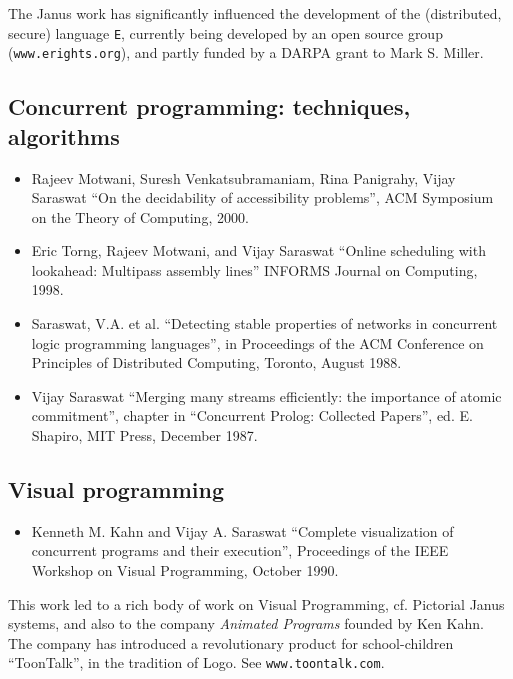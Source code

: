 \documentclass{article}
\begin{document}
The {\sf Janus} work has significantly influenced the development of
the (distributed, secure) language {\tt E}, currently being developed
by an open source group ({\tt www.erights.org}), and partly funded by
a DARPA grant to Mark S. Miller.

\subsection*{Concurrent programming: techniques, algorithms}
\begin{itemize} 
\item   Rajeev Motwani, Suresh Venkatsubramaniam, Rina Panigrahy, Vijay
   Saraswat ``On the decidability of accessibility problems'', ACM
   Symposium on the Theory of Computing, 2000.

\item   Eric Torng, Rajeev Motwani, and Vijay Saraswat ``Online
   scheduling with lookahead: Multipass assembly lines''
   INFORMS Journal on Computing, 1998.

\item   Saraswat, V.A. et al. ``Detecting stable properties
   of networks in concurrent logic programming languages'', in
   Proceedings of the ACM Conference on Principles of
   Distributed Computing, Toronto, August 1988.
  
\item   Vijay Saraswat ``Merging many streams efficiently: the
   importance of atomic commitment'', chapter in ``Concurrent
   Prolog: Collected Papers'', ed. E. Shapiro, MIT Press, December
   1987.
\end{itemize}

\subsection*{Visual programming}
\begin{itemize} 
\item    Kenneth M. Kahn and Vijay A. Saraswat ``Complete
    visualization of concurrent programs and their execution'',
    Proceedings of the IEEE Workshop on Visual Programming, October
    1990. 
\end{itemize} 

This work led to a rich body of work on Visual Programming, cf.{}
Pictorial Janus systems, and also to the company {\em Animated
Programs} founded by Ken Kahn. The company has introduced a
revolutionary product for school-children ``ToonTalk'', in the
tradition of Logo. See {\tt www.toontalk.com}.
    
\end{document}
